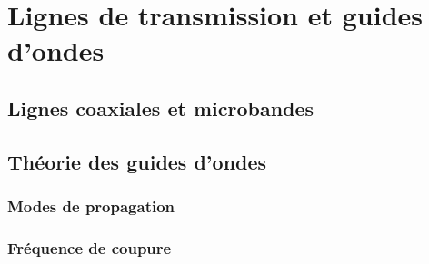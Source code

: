 \chapter{Lignes de transmission et guides d'ondes} \label{sec:waveguides}
\section{Lignes coaxiales et microbandes} \label{subsec:coaxial_microstrip}
\section{Théorie des guides d'ondes} \label{subsec:waveguide_theory}
\subsection{Modes de propagation} \label{subsec:modes_propagation}
\subsection{Fréquence de coupure} \label{subsec:cutoff_frequency}
